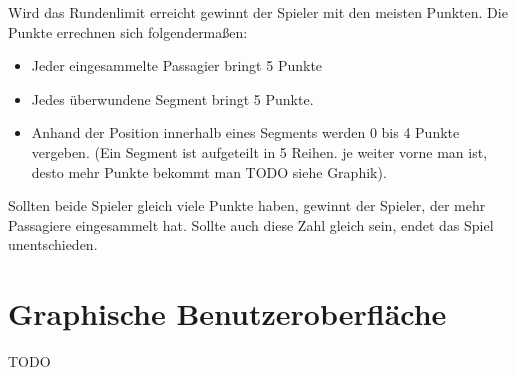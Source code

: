 \documentclass[12pt,a4paper, ngerman, oneside]{scrartcl}
\begin{document}
Wird das Rundenlimit erreicht gewinnt der Spieler mit den meisten Punkten. Die
Punkte errechnen sich folgendermaßen:

\begin{itemize}
  \item Jeder eingesammelte Passagier bringt 5 Punkte
  \item Jedes überwundene Segment bringt 5 Punkte.
  \item Anhand der Position innerhalb eines Segments werden 0 bis 4 Punkte
    vergeben. (Ein Segment ist aufgeteilt in 5 Reihen. je weiter vorne man ist,
    desto mehr Punkte bekommt man TODO siehe Graphik).
\end{itemize}

Sollten beide Spieler gleich viele Punkte haben, gewinnt der Spieler, der mehr
Passagiere eingesammelt hat. Sollte auch diese Zahl gleich sein, endet das Spiel
unentschieden.

\section{Graphische Benutzeroberfläche}

TODO
\end{document}
